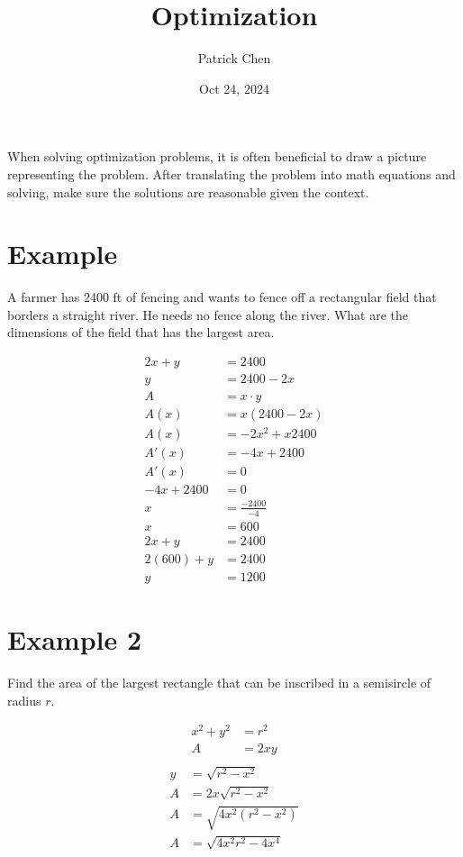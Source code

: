 \documentclass{article}
\title{Optimization}
\author{Patrick Chen}
\date{Oct 24, 2024}
\theoremstyle{mytheoremstyle}
\theoremstyle{mytheoremstyle}
\theoremstyle{myproblemstyle}
\begin{document}
    \maketitle
    When solving optimization problems, it is often beneficial to draw a picture
    representing the problem. After translating the problem into math equations
    and solving, make sure the solutions are reasonable given the context.

    \section*{Example}
    A farmer has 2400 ft of fencing and wants to fence off a rectangular field
    that borders a straight river. He needs no fence along the river. What are
    the dimensions of the field that has the largest area.

    \begin{align*}
        2x + y &= 2400 \\
        y &= 2400 - 2x \\
        A &= x\cdot y \\
        A(x) &= x(2400-2x) \\
        A(x) &= -2x^2+x2400 \\
        A'(x) &= -4x+2400 \\
        A'(x)&= 0 \\
        -4x+2400 &= 0 \\
        x &= \frac{-2400}{-4} \\
        x &= 600 \\
        2x + y &= 2400 \\
        2(600) + y &= 2400 \\
        y &= 1200
    \end{align*}

    \section*{Example 2}
    Find the area of the largest rectangle that can be inscribed in a semisircle
    of radius $r$.

    \begin{align*}
        x^2 + y^2 &= r^2 \\
        A &= 2xy \\
    \end{align*}
    \begin{align*}
        y &= \sqrt{r^2-x^2} \\
        A &= 2x\sqrt{r^2-x^2} \\
        A &= \sqrt{4x^2(r^2-x^2)} \\
        A &= \sqrt{4x^2r^2-4x^4}
    \end{align*}
\end{document}
